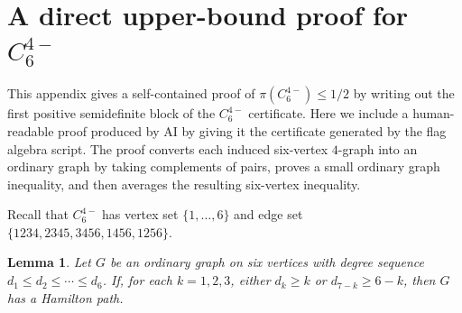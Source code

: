 \documentclass[10pt,a4paper]{article}
\theoremstyle{plain}
\newtheorem{lemma}[lemma]{Lemma}
\theoremstyle{definition}
\begin{document}
\appendix
{}

\section{A direct upper-bound proof for \texorpdfstring{$C_6^{4-}$}{C6 minus}}\label{APP:C6minus-direct-upper}

This appendix gives a self-contained proof of $\pi(C_6^{4-})\le1/2$ by writing out the first positive semidefinite block of the $C_6^{4-}$ certificate.
Here we include a human-readable proof produced by AI by giving it the certificate generated by the flag algebra script.
The proof converts each induced six-vertex $4$-graph into an ordinary graph by taking complements of pairs, proves a small ordinary graph inequality, and then averages the resulting six-vertex inequality.

Recall that $C_6^{4-}$ has vertex set $\{1,\ldots,6\}$ and edge set $\{1234,2345,3456,1456,1256\}$.

\begin{lemma}\label{LEM:appendix-path-chvatal}
Let $G$ be an ordinary graph on six vertices with degree sequence $d_1\le d_2\le \cdots\le d_6$.
If, for each $k=1,2,3$, either $d_k\ge k$ or $d_{7-k}\ge6-k$, then $G$ has a Hamilton path.
\end{lemma}
\end{document}
